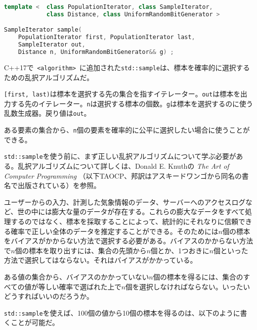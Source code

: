 %

\bgroup
\begin{lstlisting}[language=C++]
template <  class PopulationIterator, class SampleIterator,
            class Distance, class UniformRandomBitGenerator >

SampleIterator sample(
    PopulationIterator first, PopulationIterator last,
    SampleIterator out,
    Distance n, UniformRandomBitGenerator&& g) ;
\end{lstlisting}
\egroup

C++17で~\lstinline!<algorithm>!~に追加された\lstinline!std::sample!は、標本を確率的に選択するための乱択アルゴリズムだ。

\lstinline![first, last)!は標本を選択する先の集合を指すイテレーター。\lstinline!out!は標本を出力する先のイテレーター。\lstinline!n!は選択する標本の個数。\lstinline!g!は標本を選択するのに使う乱数生成器。戻り値は\lstinline!out!。

ある要素の集合から、\lstinline!n!個の要素を確率的に公平に選択したい場合に使うことができる。

%

\lstinline!std::sample!を使う前に、まず正しい乱択アルゴリズムについて学ぶ必要がある。乱択アルゴリズムについて詳しくは、Donald
E. Knuthの \emph{The Art of Computer Programming}
（以下TAOCP、邦訳はアスキードワンゴから同名の書名で出版されている）を参照。

ユーザーからの入力、計測した気象情報のデータ、サーバーへのアクセスログなど、世の中には膨大な量のデータが存在する。これらの膨大なデータをすべて処理するのではなく、標本を採取することによって、統計的にそれなりに信頼できる確率で正しい全体のデータを推定することができる。そのためには\(n\)個の標本をバイアスがかからない方法で選択する必要がある。バイアスのかからない方法で\(n\)個の標本を取り出すには、集合の先頭から\(n\)個とか、1つおきに\(n\)個といった方法で選択してはならない。それはバイアスがかかっている。

ある値の集合から、バイアスのかかっていない\(n\)個の標本を得るには、集合のすべての値が等しい確率で選ばれた上で\(n\)個を選択しなければならない。いったいどうすればいいのだろうか。

\lstinline!std::sample!を使えば、100個の値から10個の標本を得るのは、以下のように書くことが可能だ。

